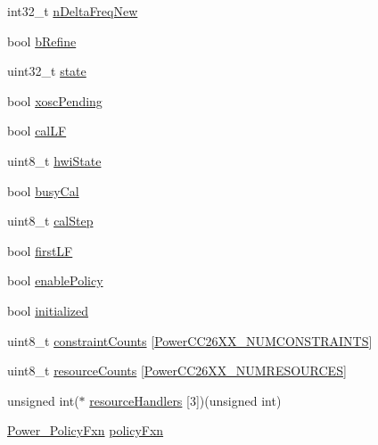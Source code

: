 \begin{DoxyCompactItemize}
int32\+\_\+t \hyperlink{struct_power_c_c26_x_x___module_state_a5ba698f9b08cd1fa921a376c386f4002}{n\+Delta\+Freq\+New}
\item 
bool \hyperlink{struct_power_c_c26_x_x___module_state_abbeb88a5424af553d50baa10acad9804}{b\+Refine}
\item 
uint32\+\_\+t \hyperlink{struct_power_c_c26_x_x___module_state_a94573418a672016214ff7c62dc27bc8f}{state}
\item 
bool \hyperlink{struct_power_c_c26_x_x___module_state_a89a7943515d2c6eb7da22a2017c3891c}{xosc\+Pending}
\item 
bool \hyperlink{struct_power_c_c26_x_x___module_state_aac1b3efea8ce636fe2ccfdc97fe03aa3}{cal\+L\+F}
\item 
uint8\+\_\+t \hyperlink{struct_power_c_c26_x_x___module_state_ae1e7421cc42f5181b00720174d81ede7}{hwi\+State}
\item 
bool \hyperlink{struct_power_c_c26_x_x___module_state_a9311e19be396a5ab3c8b2d5f6bfff6f3}{busy\+Cal}
\item 
uint8\+\_\+t \hyperlink{struct_power_c_c26_x_x___module_state_a45966e49f7fc38e3006ef3aa68761188}{cal\+Step}
\item 
bool \hyperlink{struct_power_c_c26_x_x___module_state_a702ec4760d50a0bcb6577ff029938ae5}{first\+L\+F}
\item 
bool \hyperlink{struct_power_c_c26_x_x___module_state_ad1d986fdb2bc8fe27a4d5341eaa059ef}{enable\+Policy}
\item 
bool \hyperlink{struct_power_c_c26_x_x___module_state_a587f4424044334445086b426953a3e5c}{initialized}
\item 
uint8\+\_\+t \hyperlink{struct_power_c_c26_x_x___module_state_af141040006ff722deab0a60947de14c9}{constraint\+Counts} \mbox{[}\hyperlink{_power_c_c26_x_x_8h_a08e787d2a1ff1b373b209e68fc797e31}{Power\+C\+C26\+X\+X\+\_\+\+N\+U\+M\+C\+O\+N\+S\+T\+R\+A\+I\+N\+T\+S}\mbox{]}
\item 
uint8\+\_\+t \hyperlink{struct_power_c_c26_x_x___module_state_af13aa7f8e1d035365a1f2b8b30e57a61}{resource\+Counts} \mbox{[}\hyperlink{_power_c_c26_x_x_8h_af422d71a354f486c975a44e0dddd5845}{Power\+C\+C26\+X\+X\+\_\+\+N\+U\+M\+R\+E\+S\+O\+U\+R\+C\+E\+S}\mbox{]}
\item 
unsigned int($\ast$ \hyperlink{struct_power_c_c26_x_x___module_state_ac8d49a96f7ae612895080a07378d3dbd}{resource\+Handlers} \mbox{[}3\mbox{]})(unsigned int)
\item 
\hyperlink{_power_8h_a333038d1e9cd5f93dda7b83f8a1afa8b}{Power\+\_\+\+Policy\+Fxn} \hyperlink{struct_power_c_c26_x_x___module_state_a11876366e8d0d07879231d033ab31e57}{policy\+Fxn}
\end{DoxyCompactItemize}


